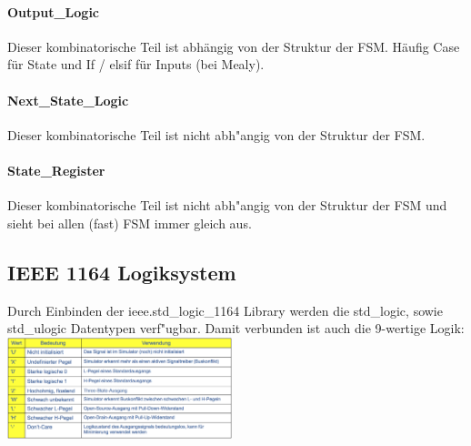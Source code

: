 \begin{multicols}{2}
	\paragraph{Output\_Logic}
		Dieser kombinatorische Teil ist abhängig von der Struktur der FSM. Häufig Case für State und If / elsif für Inputs (bei Mealy).
		
	\vfill\null
	\columnbreak
	\paragraph{Next\_State\_Logic} 
		Dieser kombinatorische Teil ist nicht abh"angig von der Struktur der FSM.
		
\end{multicols}

\begin{multicols}{2}
	\paragraph{State\_Register}  
	Dieser kombinatorische Teil ist nicht abh"angig von der Struktur der 
	FSM und sieht bei allen (fast) FSM immer gleich aus.
	
					
	\subsection{IEEE 1164 Logiksystem}
	Durch Einbinden der ieee.std\_logic\_1164 Library werden die std\_logic, sowie std\_ulogic Datentypen verf"ugbar. Damit verbunden ist auch die 9-wertige Logik:
	\includegraphics[width=0.49\textwidth]{pics/ieee1164logicsystem}
\end{multicols}
		

